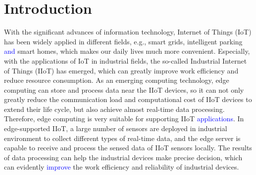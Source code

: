 \documentclass[IEEE JOURNAL OF BIOMEDICAL AND HEALTH INFORMATICS]{IEEEtran}
\begin{document}
%
\IEEEpeerreviewmaketitle

\section{Introduction}
With the significant advances of information technology, Internet of Things (IoT) \cite{IOT1,IOT2} has been widely applied in different fields, e.g., smart grids, intelligent parking \textcolor{blue}{and} smart homes, which makes our daily lives much more convenient. Especially, with the applications of IoT in industrial fields, the so-called Industrial Internet of Things (IIoT) \cite{8843900} has emerged, which can greatly improve work efficiency and reduce resource consumption. As an emerging computing technology, edge computing \cite{8016573} can store and process data near the IIoT devices, so it can not only greatly reduce the communication load and computational cost of IIoT devices to extend their life cycle, but also achieve almost real-time data processing. Therefore, edge computing is very suitable for supporting IIoT \textcolor{blue}{applications}. In edge-supported IIoT, a large number of sensors are deployed in industrial environment to collect different types of real-time data, and the edge server is capable to receive and process the sensed data of IIoT sensors locally. The results of data processing can help the industrial devices make precise decision, which can evidently \textcolor{blue}{improve} the work efficiency and reliability of industrial devices. 
\end{document}
